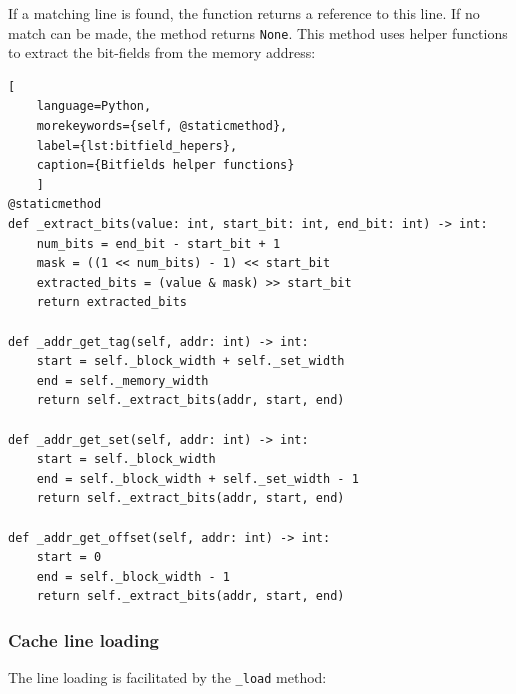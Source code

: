 \noindent If a matching line is found, the function returns a reference to this line. If no match can be made, the method returns \texttt{None}. This method uses helper functions
to extract the bit-fields from the memory address:


\begin{center}
\centering
\begin{minipage}{\linewidth}
\begin{lstlisting}[
    language=Python,
	morekeywords={self, @staticmethod},
    label={lst:bitfield_hepers},
    caption={Bitfields helper functions}
    ]
@staticmethod
def _extract_bits(value: int, start_bit: int, end_bit: int) -> int:
    num_bits = end_bit - start_bit + 1
    mask = ((1 << num_bits) - 1) << start_bit
    extracted_bits = (value & mask) >> start_bit
    return extracted_bits

def _addr_get_tag(self, addr: int) -> int:
    start = self._block_width + self._set_width
    end = self._memory_width
    return self._extract_bits(addr, start, end)

def _addr_get_set(self, addr: int) -> int:
    start = self._block_width
    end = self._block_width + self._set_width - 1
    return self._extract_bits(addr, start, end)

def _addr_get_offset(self, addr: int) -> int:
    start = 0
    end = self._block_width - 1
    return self._extract_bits(addr, start, end)
\end{lstlisting}
\end{minipage}
\end{center}

\subsubsection*{Cache line loading}
\noindent The line loading is facilitated by the \texttt{\_load} method:


